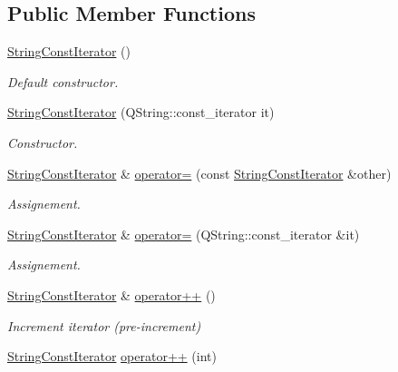 \subsection*{Public Member Functions}
\begin{DoxyCompactItemize}
\item 
\hyperlink{struct_mdt_1_1_plain_text_1_1_string_const_iterator_aebc75afef8accb5faf0dc33d065f898f}{String\+Const\+Iterator} ()
\begin{DoxyCompactList}\small\item\em Default constructor. \end{DoxyCompactList}\item 
\hyperlink{struct_mdt_1_1_plain_text_1_1_string_const_iterator_ae2cad12d2b7751eaf0a00a69678275ec}{String\+Const\+Iterator} (Q\+String\+::const\+\_\+iterator it)
\begin{DoxyCompactList}\small\item\em Constructor. \end{DoxyCompactList}\item 
\hyperlink{struct_mdt_1_1_plain_text_1_1_string_const_iterator}{String\+Const\+Iterator} \& \hyperlink{struct_mdt_1_1_plain_text_1_1_string_const_iterator_a5ff7bd8002a95fcb2e1aed0a27d4d60c}{operator=} (const \hyperlink{struct_mdt_1_1_plain_text_1_1_string_const_iterator}{String\+Const\+Iterator} \&other)
\begin{DoxyCompactList}\small\item\em Assignement. \end{DoxyCompactList}\item 
\hyperlink{struct_mdt_1_1_plain_text_1_1_string_const_iterator}{String\+Const\+Iterator} \& \hyperlink{struct_mdt_1_1_plain_text_1_1_string_const_iterator_acff7207d9b0257518a2845dbbce19f0f}{operator=} (Q\+String\+::const\+\_\+iterator \&it)
\begin{DoxyCompactList}\small\item\em Assignement. \end{DoxyCompactList}\item 
\hyperlink{struct_mdt_1_1_plain_text_1_1_string_const_iterator}{String\+Const\+Iterator} \& \hyperlink{struct_mdt_1_1_plain_text_1_1_string_const_iterator_a289ce7f324a31e2d0977ba6e9b5460dc}{operator++} ()
\begin{DoxyCompactList}\small\item\em Increment iterator (pre-\/increment) \end{DoxyCompactList}\item 
\hyperlink{struct_mdt_1_1_plain_text_1_1_string_const_iterator}{String\+Const\+Iterator} \hyperlink{struct_mdt_1_1_plain_text_1_1_string_const_iterator_a107f05451d845ef3371adc7300f52b03}{operator++} (int)

\end{DoxyCompactItemize}
